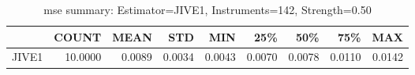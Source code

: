\begin{table}[ht]
\centering
\caption{mse summary: Estimator=JIVE1, Instruments=142, Strength=0.50}
\begin{tabular}{lrrrrrrrr}
\toprule
 & COUNT & MEAN & STD & MIN & 25\% & 50\% & 75\% & MAX \\
\midrule
JIVE1 & 10.0000 & 0.0089 & 0.0034 & 0.0043 & 0.0070 & 0.0078 & 0.0110 & 0.0142 \\
\bottomrule
\end{tabular}
\end{table}
